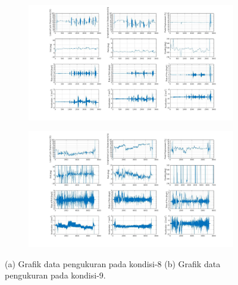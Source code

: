 \begin{figure}[H]
	\begin{subfigure}{0.49\textwidth}
		\centering
		\includegraphics[width=\linewidth]{gambar/Condition_8.jpg}
		\caption{}
		\label{fig:condition_8}
	\end{subfigure}
	\centering
	\begin{subfigure}{0.49\textwidth}
		\centering
		\includegraphics[width=\linewidth]{gambar/Condition_9.jpg}
		\caption{}
		\label{fig:condition_9}
	\end{subfigure}
	\caption{(a) Grafik data pengukuran pada kondisi-8 (b) Grafik data pengukuran pada kondisi-9.}
\end{figure}

